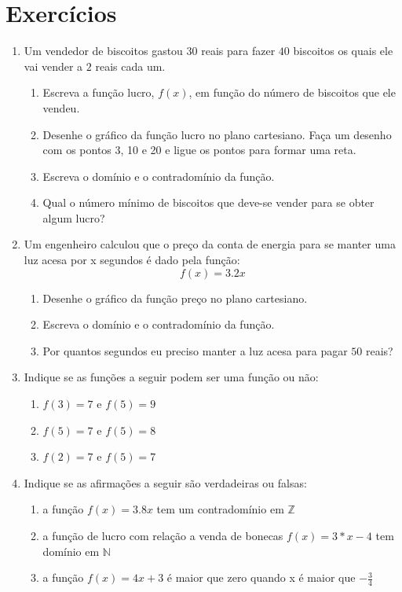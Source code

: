 \documentclass[11pt]{article}
\begin{document}
\section{Exercícios}
\begin{enumerate}
	\item Um vendedor de biscoitos gastou $30$ reais para fazer $40$ 
		  biscoitos os quais ele vai vender a $2$ reais cada um.
	\begin{enumerate}
		\item Escreva a função lucro, $f(x)$, em função do número de 
			  biscoitos que ele vendeu.
		\item Desenhe o gráfico da função lucro no plano cartesiano. Faça
			  um desenho com os pontos 3, 10 e 20 e ligue os pontos para
			  formar uma reta.
		\item Escreva o domínio e o contradomínio da função.
		\item Qual o número mínimo de biscoitos que deve-se vender para se
			  obter algum lucro?
	\end{enumerate}

	\item Um engenheiro calculou que o preço da conta de energia para se 
		  manter uma luz acesa por x segundos é dado pela função:
		  $$f(x) = 3.2x$$
	\begin{enumerate}
		\item Desenhe o gráfico da função preço no plano cartesiano.
		\item Escreva o domínio e o contradomínio da função.
		\item Por quantos segundos eu preciso manter a luz acesa para pagar
			  $50$ reais?
	\end{enumerate}

	\item Indique se as funções a seguir podem ser uma função ou não:
	\begin{enumerate}
		\item $f(3) = 7$ e $f(5) = 9$
		\item $f(5) = 7$ e $f(5) = 8$
		\item $f(2) = 7$ e $f(5) = 7$
	\end{enumerate}

	\item Indique se as afirmações a seguir são verdadeiras ou falsas:
	\begin{enumerate}
		\item a função $f(x) = 3.8x$ tem um contradomínio em $\mathbb{Z}$
		\item a função de lucro com relação a venda de bonecas 
			  $f(x) = 3*x - 4$ tem domínio em $\mathbb{N}$
		\item a função $f(x) = 4x + 3$ é maior que zero quando x é maior que
			  $-\frac{3}{4}$
	\end{enumerate}


\end{enumerate}
\end{document}
